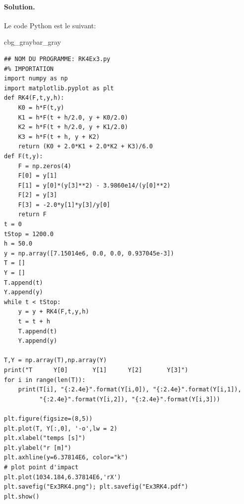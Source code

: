 \documentclass[%
oneside,                 %
final,                   %
10pt,french]{article}
\newenvironment{_pro_tight}[2]{
   \def\FrameCommand{\color{#2}\vrule width 1mm\normalcolor\colorbox{#1}}
   \FrameRule0.6pt\MakeFramed {\advance\hsize-2mm\FrameRestore}\vskip3mm}
   {\vskip0mm\endMakeFramed}
\newenvironment{pro}[2]{
\bgroup\rmfamily
\fboxsep=0mm\relax
\begin{_pro_tight}{#1}{#2}
\list{}{\parsep=-2mm\parskip=0mm\topsep=0pt\leftmargin=2mm
\rightmargin=2\leftmargin\leftmargin=4pt\relax}
\item\relax}
{\endlist\end{_pro_tight}\egroup}
\newenvironment{doconceexercise}{}{}
\begin{document}
\begin{doconceexercise}
\paragraph{Solution.}
Le code Python est le suivant:

\begin{pro}{cbg_gray}{bar_gray}\begin{verbatim}
## NOM DU PROGRAMME: RK4Ex3.py
#% IMPORTATION
import numpy as np
import matplotlib.pyplot as plt
def RK4(F,t,y,h):
    K0 = h*F(t,y)
    K1 = h*F(t + h/2.0, y + K0/2.0)
    K2 = h*F(t + h/2.0, y + K1/2.0)
    K3 = h*F(t + h, y + K2)
    return (K0 + 2.0*K1 + 2.0*K2 + K3)/6.0
def F(t,y):
    F = np.zeros(4)
    F[0] = y[1]
    F[1] = y[0]*(y[3]**2) - 3.9860e14/(y[0]**2)
    F[2] = y[3]
    F[3] = -2.0*y[1]*y[3]/y[0]
    return F
t = 0
tStop = 1200.0
h = 50.0
y = np.array([7.15014e6, 0.0, 0.0, 0.937045e-3])
T = []
Y = []
T.append(t)
Y.append(y)
while t < tStop:
    y = y + RK4(F,t,y,h)
    t = t + h
    T.append(t)
    Y.append(y)
    
T,Y = np.array(T),np.array(Y)
print("T      Y[0]       Y[1]      Y[2]       Y[3]")
for i in range(len(T)):
    print(T[i], "{:2.4e}".format(Y[i,0]), "{:2.4e}".format(Y[i,1]),
          "{:2.4e}".format(Y[i,2]), "{:2.4e}".format(Y[i,3]))
    
plt.figure(figsize=(8,5))
plt.plot(T, Y[:,0], '-o',lw = 2)
plt.xlabel("temps [s]")
plt.ylabel("r [m]")
plt.axhline(y=6.37814E6, color="k")
# plot point d'impact
plt.plot(1034.184,6.37814E6,'rX')
plt.savefig("Ex3RK4.png"); plt.savefig("Ex3RK4.pdf")
plt.show()
\end{verbatim}
\end{pro}
\noindent


\end{doconceexercise}
\end{document}
